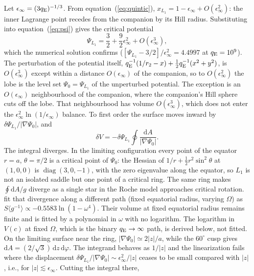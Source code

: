 \documentclass[twocolumn]{aastex702}
\newcommand{\qE}{q_{\rm E}}
\newcommand{\dd}{\mathrm{d}}
\begin{document}
Let $\epsilon_\infty=(3\qE)^{-1/3}$. From equation~(\ref{eq:quintic}), $x_{L_1}=1-\epsilon_\infty+O(\epsilon_\infty^2)$: the inner Lagrange point recedes from the companion by its Hill radius. Substituting into equation~(\ref{eq:psi}) gives the critical potential
\begin{equation}
\Psi_{L_1}=\frac32+\frac92\epsilon_\infty^2+O(\epsilon_\infty^3),
\label{eq:zc}
\end{equation}
which the numerical solution confirms ($[\Psi_{L_1}-3/2]/\epsilon_\infty^2=4.4997$ at $\qE=10^9$). The perturbation of the potential itself, $\qE^{-1}(1/r_2-x)+\tfrac12\qE^{-1}(x^2+y^2)$, is $O(\epsilon_\infty^3)$ except within a distance $O(\epsilon_\infty)$ of the companion, so to $O(\epsilon_\infty^2)$ the lobe is the level set $\Psi_0=\Psi_{L_1}$ of the unperturbed potential. The exception is an $O(\epsilon_\infty)$ neighbourhood of the companion, where the companion's Hill sphere cuts off the lobe. That neighbourhood has volume $O(\epsilon_\infty^3)$, which does not enter the $\epsilon_\infty^2\ln(1/\epsilon_\infty)$ balance. To first order the surface moves inward by $\delta\Psi_{L_1}/|\nabla\Psi_0|$, and
\begin{equation}
\delta V=-\delta\Psi_{L_1}\oint\frac{\dd A}{|\nabla\Psi_0|}.
\label{eq:dV}
\end{equation}
The integral diverges. In the limiting configuration every point of the equator $r=a$, $\theta=\pi/2$ is a critical point of $\Psi_0$: the Hessian of $1/r+\tfrac12r^2\sin^2\theta$ at $(1,0,0)$ is $\operatorname{diag}(3,0,-1)$, with the zero eigenvalue along the equator, so $L_1$ is not an isolated saddle but one point of a critical ring. The same ring makes $\oint\mathrm{d}A/g$ diverge as a single star in the Roche model approaches critical rotation. \citet{Paxton2019} fit that divergence along a different path (fixed equatorial radius, varying $\Omega$) as $S\langle g^{-1}\rangle\propto-0.5583\ln(1-\omega^4)$. Their volume at fixed equatorial radius remains finite and is fitted by a polynomial in $\omega$ with no logarithm. The logarithm in $V(c)$ at fixed $\Omega$, which is the binary $\qE\to\infty$ path, is derived below, not fitted. On the limiting surface near the ring, $|\nabla\Psi_0|\simeq2|z|/a$, while the $60^\circ$ cusp gives $\dd A=(2/\sqrt3)\,\dd z\,\dd\varphi$. The integrand behaves as $1/|z|$ and the linearization fails where the displacement $\delta\Psi_{L_1}/|\nabla\Psi_0|\sim\epsilon_\infty^2/|z|$ ceases to be small compared with $|z|$, i.e., for $|z|\lesssim\epsilon_\infty$. Cutting the integral there,
\end{document}
